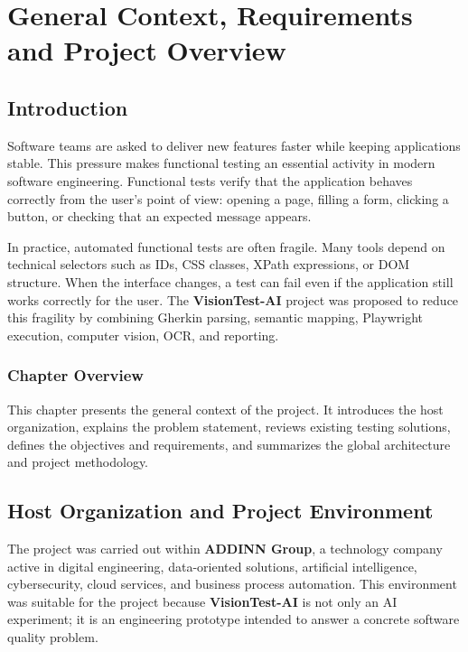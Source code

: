 \chapter{General Context, Requirements and Project Overview}
\label{chap:overview}
\minitoc
\newpage

\section{Introduction}
\label{sec:chapter1_intro}

Software teams are asked to deliver new features faster while keeping applications stable. This pressure makes functional testing an essential activity in modern software engineering. Functional tests verify that the application behaves correctly from the user's point of view: opening a page, filling a form, clicking a button, or checking that an expected message appears.

In practice, automated functional tests are often fragile. Many tools depend on technical selectors such as IDs, CSS classes, XPath expressions, or DOM structure. When the interface changes, a test can fail even if the application still works correctly for the user. The \textbf{VisionTest-AI} project was proposed to reduce this fragility by combining Gherkin parsing, semantic mapping, Playwright execution, computer vision, OCR, and reporting.

\subsection*{Chapter Overview}
{}

This chapter presents the general context of the project. It introduces the host organization, explains the problem statement, reviews existing testing solutions, defines the objectives and requirements, and summarizes the global architecture and project methodology.

\section{Host Organization and Project Environment}
\label{sec:host_environment}

The project was carried out within \textbf{ADDINN Group}, a technology company active in digital engineering, data-oriented solutions, artificial intelligence, cybersecurity, cloud services, and business process automation. This environment was suitable for the project because \textbf{VisionTest-AI} is not only an AI experiment; it is an engineering prototype intended to answer a concrete software quality problem.

